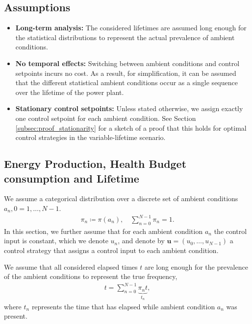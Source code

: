 \documentclass{article}
\begin{document}
    \subsection{Assumptions}
    \begin{itemize}
        \item \textbf{Long-term analysis:} The considered lifetimes are assumed long enough for the statistical distributions to represent the actual prevalence of ambient conditions.
        \item \textbf{No temporal effects:} Switching between ambient conditions and control setpoints incurs no cost. As a result, for simplification, it can be assumed that the different statistical ambient conditions occur as a single sequence over the lifetime of the power plant.
        \item \textbf{Stationary control setpoints:} Unless stated otherwise, we assign exactly one control setpoint for each ambient condition. See Section \ref{subsec:proof_stationarity} for a sketch of a proof that this holds for optimal control strategies in the variable-lifetime scenario.
    \end{itemize}
        
    \subsection{Energy Production, Health Budget consumption and Lifetime}
    We assume a categorical distribution over a discrete set of ambient conditions $a_n, 0 = 1, \dots, N - 1$.
    \begin{align}
        \pi_n \coloneqq \pi(a_n), \quad \sum_{n = 0}^{N - 1} \pi_n = 1.
    \end{align}
    In this section, we further assume that for each ambient condition $a_n$ the control input is constant, which we denote $u_n$, and denote by $\boldsymbol{u} = (u_0, \dots, u_{N - 1})$ a control strategy that assigns a control input to each ambient condition.

    We assume that all considered elapsed times $t$ are long enough for the prevalence of the ambient conditions to represent the true frequency,
    \begin{align}
        t = \sum_{n = 0}^{N - 1}\underbrace{\pi_n t}_{t_n},
    \end{align}
    where $t_n$ represents the time that has elapsed while ambient condition $a_n$ was present.
\end{document}
